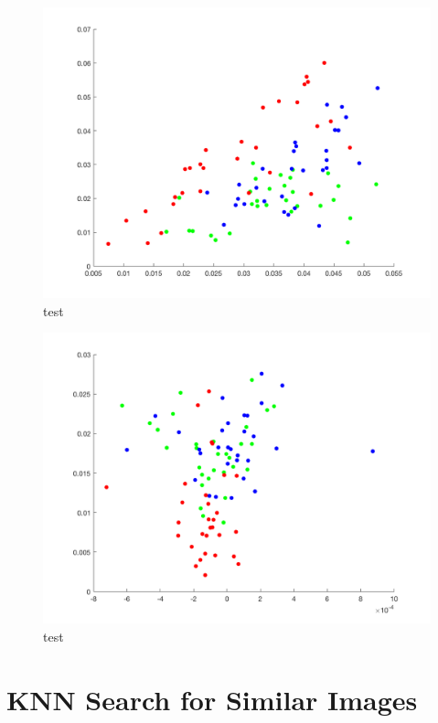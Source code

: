 \begin{figure}[!hbt]
  \includegraphics[width=\textwidth]{img/sd41_sd25}
    \caption{test}
  \label{fig:sd41_sd25}
\end{figure}

\begin{figure}[!hbt]
  \includegraphics[width=\textwidth]{img/m21_sd21}
    \caption{test}
  \label{fig:m21_sd21}
\end{figure}

\section{KNN Search for Similar Images}


